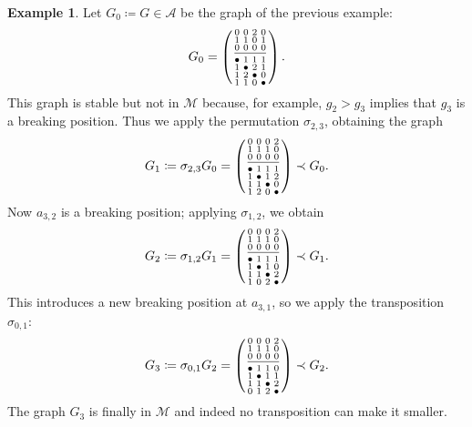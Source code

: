 \documentclass{amsart}
\theoremstyle{plain}
\theoremstyle{definition}
\newtheorem{example}[theorem]{Example}
\newcommand{\psm}[1]{\left(\begin{smallmatrix}#1\end{smallmatrix}\right)}
\begin{document}
\begin{example}
  Let $G_0 \coloneqq G \in \mathcal{A}$ be the graph of the previous
  example:
  \[
  G_0 = \psm{
    0 & 0 & 2 & 0\\
    1 & 1 & 0 & 1\\
    0 & 0 & 0 & 0\\[2pt]
    \hline\\[1pt]
    \bullet & 1 & 1 & 1\\
    1 &\bullet & 2 & 1\\
    1 & 2 & \bullet & 0\\
    1 & 1 & 0 & \bullet
  }\text{.}
  \]
  This graph is stable but not in $\mathcal{M}$ because, for example,
  $g_2 > g_3$ implies that $g_3$ is a breaking position. Thus we apply
  the permutation $\sigma_{2,3}$, obtaining the graph
  \[
  G_1 \coloneqq \sigma_{2,3} G_0 = \psm{
    0 & 0 & 0 & 2\\
    1 & 1 & 1 & 0\\
    0 & 0 & 0 & 0\\[2pt]
    \hline\\[1pt]
    \bullet & 1 & 1 & 1\\
    1 & \bullet & 1 & 2\\
    1 & 1 & \bullet & 0\\
    1 & 2 & 0 & \bullet
  } \prec G_0\text{.}
  \]
  Now $a_{3,2}$ is a breaking position; applying $\sigma_{1,2}$, we
  obtain
  \[
  G_2 \coloneqq \sigma_{1,2} G_1 = \psm{
    0 & 0 & 0 & 2\\
    1 & 1 & 1 & 0\\
    0 & 0 & 0 & 0\\[2pt]
    \hline\\[1pt]
    \bullet & 1 & 1 & 1\\
    1 & \bullet & 1 & 0\\
    1 & 1 & \bullet & 2\\
    1 & 0 & 2 & \bullet
  } \prec G_1\text{.}
  \]
  This introduces a new breaking position at $a_{3,1}$, so we apply
  the transposition $\sigma_{0,1}$:
  \[
  G_3 \coloneqq \sigma_{0,1} G_2 = \psm{
    0 & 0 & 0 & 2\\
    1 & 1 & 1 & 0\\
    0 & 0 & 0 & 0\\[2pt]
    \hline\\[1pt]
    \bullet & 1 & 1 & 0\\
    1 & \bullet & 1 & 1\\
    1 & 1 & \bullet & 2\\
    0 & 1 & 2 & \bullet
  } \prec G_2\text{.}
  \]
  The graph $G_3$ is finally in $\mathcal{M}$ and indeed no
  transposition can make it smaller.
\end{example}
\end{document}
